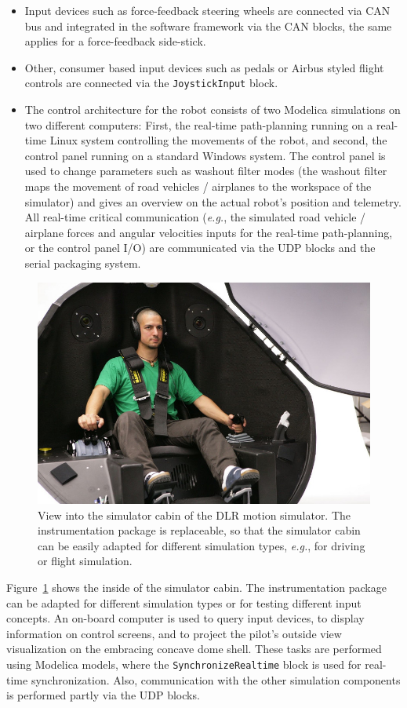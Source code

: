 \documentclass{resources/modelica}
\newcommand{\modelica}[1]{\lstinline[language=modelica]|#1|}
\begin{document}
\begin{itemize}
  \item Input devices such as force-feedback steering wheels are connected via CAN bus
and integrated in the software framework via the CAN blocks, the same
applies for a force-feedback side-stick.
  \item Other, consumer based input devices such as pedals or Airbus styled flight
controls are connected via the \modelica{JoystickInput} block.
  \item The control architecture for the robot consists of two Modelica simulations on
two different computers: First, the real-time path-planning running on a
real-time Linux system controlling the movements of the robot, and second, the
control panel running on a standard Windows system. The control panel is used to
change parameters such as washout filter modes (the washout filter maps the
movement of road vehicles / airplanes to the workspace of the simulator) and
gives an overview on the actual robot's position and telemetry. All real-time critical
communication (\textit{e.g.}, the simulated road vehicle / airplane forces and
angular velocities inputs for the real-time path-planning, or the control panel
I/O) are communicated via the UDP blocks and the serial
packaging system.
\end{itemize}

\begin{figure}[htb]
  \centering \includegraphics[width=0.9\columnwidth]{figures/DLRSimulatorCabin}
  \caption{View into the simulator cabin of the DLR motion simulator. The
  instrumentation package is replaceable, so that the simulator cabin can be
  easily adapted for different simulation types, \textit{e.g.}, for driving or
  flight simulation.}
  \label{fig:DLRSimulatorCabin}
\end{figure}
Figure~\ref{fig:DLRSimulatorCabin} shows the inside of the simulator cabin.
The instrumentation package can be adapted
for different simulation types or for testing different input concepts.
An on-board computer is used to query input devices, to display information on
control screens, and to project the pilot's outside view visualization on the
embracing concave dome shell. These
tasks are performed using Modelica models, where the
\modelica{SynchronizeRealtime} block is used for real-time
synchronization. Also, communication with the other simulation components is
performed partly via the UDP blocks.
\end{document}
